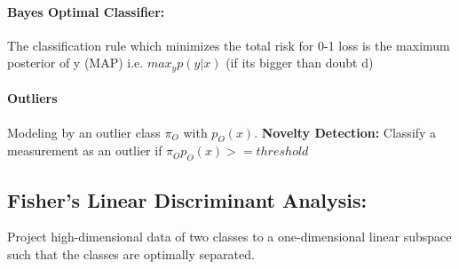\paragraph{Bayes Optimal Classifier:}
The classification rule which minimizes the total risk for 0-1 loss is the maximum posterior of y (MAP) i.e. $max_y p(y|x)$ (if its bigger than doubt d)

\paragraph{Outliers}
Modeling by an outlier class $\pi_O$ with $p_O(x)$. \textbf{Novelty Detection:} Classify a measurement as an outlier if $\pi_Op_O(x) >= threshold$

\subsection{Fisher's Linear Discriminant Analysis: }
Project high-dimensional data of two classes to a one-dimensional linear subspace such that the classes are optimally separated.


